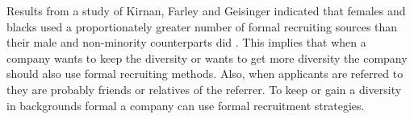 \documentclass[Main.tex]{subfiles}
\begin{document}
Results from a study of Kirnan, Farley and Geisinger indicated that females and blacks used a proportionately greater number of formal recruiting sources than their male and non-minority counterparts did \cite{tenth}. This implies that when a company wants to keep the diversity or wants to get more diversity the company should also use formal recruiting methods. Also, when applicants are referred to they are probably friends or relatives of the referrer. To keep or gain a diversity in backgrounds formal a company can use formal recruitment strategies.
\end{document}
